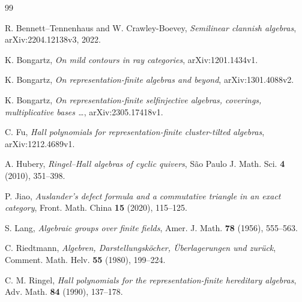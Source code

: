 \begin{thebibliography}{99}

R. Bennett--Tennenhaus and W. Crawley-Boevey,
\emph{Semilinear clannish algebras},
arXiv:2204.12138v3, 2022.

K. Bongartz,
\emph{On mild contours in ray categories},
arXiv:1201.1434v1.

K. Bongartz,
\emph{On representation-finite algebras and beyond},
arXiv:1301.4088v2.

K. Bongartz,
\emph{On representation-finite selfinjective algebras, coverings, multiplicative bases \dots},
arXiv:2305.17418v1.

C. Fu,
\emph{Hall polynomials for representation-finite cluster-tilted algebras},
arXiv:1212.4689v1.

A. Hubery,
\emph{Ringel--Hall algebras of cyclic quivers},
S\~ao Paulo J. Math. Sci. \textbf{4} (2010), 351--398.

P. Jiao,
\emph{Auslander's defect formula and a commutative triangle in an exact category},
Front. Math. China \textbf{15} (2020), 115--125.

S. Lang,
\emph{Algebraic groups over finite fields},
Amer. J. Math. \textbf{78} (1956), 555--563.

C. Riedtmann,
\emph{Algebren, Darstellungsk\"ocher, \"Uberlagerungen und zur\"uck},
Comment. Math. Helv. \textbf{55} (1980), 199--224.

C. M. Ringel,
\emph{Hall polynomials for the representation-finite hereditary algebras},
Adv. Math. \textbf{84} (1990), 137--178.

\end{thebibliography}
